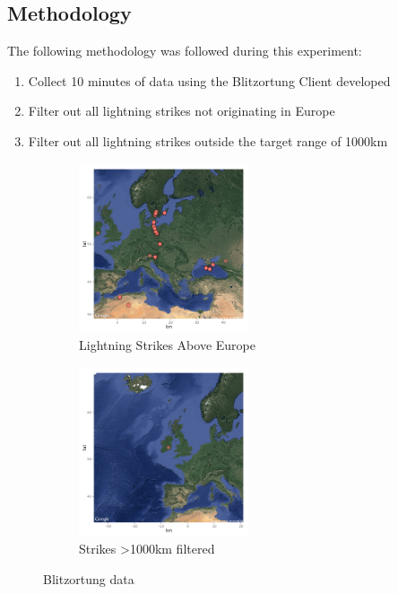 \documentclass[runningheads,a4paper]{llncs}
\begin{document}
\subsection*{Methodology}
The following methodology was followed during this experiment:

\begin{enumerate}
	\item Collect 10 minutes of data using the Blitzortung Client developed
	\item Filter out all lightning strikes not originating in Europe
	\item Filter out all lightning strikes outside the target range of 1000km
\end{enumerate}


%
\begin{figure}	
	\centering
	\begin{subfigure}[t]{5cm}
		\centering
		\includegraphics[width=5cm]{images/73}
		\caption{Lightning Strikes Above Europe}\label{fig:blitzortung_europe_plot}		
	\end{subfigure}
	\quad
	\begin{subfigure}[t]{5cm}
		\centering
		\includegraphics[width=5cm]{images/74}
		\caption{Strikes \textgreater 1000km filtered}\label{fig:blitzortung_europe_plot_filtered}
	\end{subfigure}
	\caption{Blitzortung data}\label{blitzortung_europe_plot_both}
\end{figure}
%


%
%
\newpage
\end{document}
